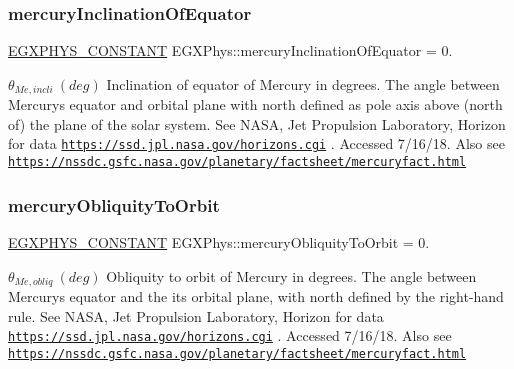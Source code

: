 \subsubsection{\texorpdfstring{mercury\+Inclination\+Of\+Equator}{mercuryInclinationOfEquator}}
{\footnotesize\ttfamily \mbox{\hyperlink{group___e_g_x_phys-_constants-_macros_ga76980d288494ce1714c9ac68a95ba702}{E\+G\+X\+P\+H\+Y\+S\+\_\+\+C\+O\+N\+S\+T\+A\+NT}} E\+G\+X\+Phys\+::mercury\+Inclination\+Of\+Equator = 0.}

$ \theta_{Me,incli} \ (deg)$ Inclination of equator of Mercury in degrees. The angle between Mercury\textquotesingle{}s equator and orbital plane with north defined as pole axis above (north of) the plane of the solar system. See N\+A\+SA, Jet Propulsion Laboratory, Horizon for data \href{https://ssd.jpl.nasa.gov/horizons.cgi}{\tt https\+://ssd.\+jpl.\+nasa.\+gov/horizons.\+cgi} . Accessed 7/16/18. Also see \href{https://nssdc.gsfc.nasa.gov/planetary/factsheet/mercuryfact.html}{\tt https\+://nssdc.\+gsfc.\+nasa.\+gov/planetary/factsheet/mercuryfact.\+html} \mbox{\label{group___e_g_x_phys-_constants-_astrophysics-_solar_system-_mercury-_orbit_ga9eab31e7775425e9d213174b91d7cb7e}} 
\subsubsection{\texorpdfstring{mercury\+Obliquity\+To\+Orbit}{mercuryObliquityToOrbit}}
{\footnotesize\ttfamily \mbox{\hyperlink{group___e_g_x_phys-_constants-_macros_ga76980d288494ce1714c9ac68a95ba702}{E\+G\+X\+P\+H\+Y\+S\+\_\+\+C\+O\+N\+S\+T\+A\+NT}} E\+G\+X\+Phys\+::mercury\+Obliquity\+To\+Orbit = 0.}

$ \theta_{Me,obliq} \ (deg)$ Obliquity to orbit of Mercury in degrees. The angle between Mercury\textquotesingle{}s equator and the it\textquotesingle{}s orbital plane, with north defined by the right-\/hand rule. See N\+A\+SA, Jet Propulsion Laboratory, Horizon for data \href{https://ssd.jpl.nasa.gov/horizons.cgi}{\tt https\+://ssd.\+jpl.\+nasa.\+gov/horizons.\+cgi} . Accessed 7/16/18. Also see \href{https://nssdc.gsfc.nasa.gov/planetary/factsheet/mercuryfact.html}{\tt https\+://nssdc.\+gsfc.\+nasa.\+gov/planetary/factsheet/mercuryfact.\+html} \mbox{\label{group___e_g_x_phys-_constants-_astrophysics-_solar_system-_mercury-_orbit_gab6a88c67a02add73a0acd9c46b05d9bb}} 
